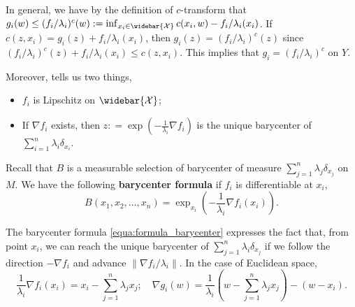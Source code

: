 \begin{rmk}
	In general, we have by the definition of $c$-transform that
	$g_i(w) \leq (f_i / \lambda_i)^c(w) := \inf_{x_i \in \widebar{ \mathcal{X} } } c(x_i, w) - f_i / \lambda_i (x_i)$.
	If $ c(z, x_i) = g_i (z) + f_i / \lambda_i (x_i)$,
	then
	$g_i(z) = (f_i / \lambda_i)^c (z)$ since $(f_i / \lambda_i)^c(z) + f_i / \lambda_i(x_i) \leq c (z, x_i)$.
	This implies that $g_i = (f_i / \lambda_i)^c$ on $Y$.
\end{rmk}

Moreover,  tells us two things,
\begin{itemize}
	\item $f_i$ is Lipschitz on $\widebar{ \mathcal{X} }$;
	\item If $ \nabla f_i $ exists, then $z: = \exp( - \frac{1}{\lambda_i}\nabla f_i)$ is the
	      unique barycenter of $\sum_{i=1}^n \lambda_i \delta_{x_i}$.
\end{itemize}
Recall that $B$ is a measurable selection of barycenter of
measure $\sum_{j=1}^{n} \lambda_j \delta_{x_j}$ on $M$.
We have the following \textbf{barycenter formula}
if $f_i$ is differentiable at $x_i$,
\begin{equation}
	\label{equa:formula_barycenter}
	B(x_1, x_2, \ldots, x_n) = \exp_{x_i} (- \frac{1}{\lambda_i} \nabla f_i(x_i)).
\end{equation}

The barycenter formula \cref{equa:formula_barycenter} expresses the fact that,
from point $x_i$,
we can reach the unique barycenter of $\sum_{j=1}^n \lambda_i \delta_{x_j}$ if we follow the direction $-\nabla f_i$
and advance $\| \nabla f_i / \lambda_i \| $.
In the case of Euclidean space,
\[
	\frac{1}{\lambda_i} \nabla f_i(x_i) = x_i - \sum_{j=1}^n \lambda_j x_j;                              \quad
	\nabla g_i(w)  = \frac{1}{\lambda_i} (w - \sum_{j=1}^n \lambda_j x_j) -(w-x_i).
\]

